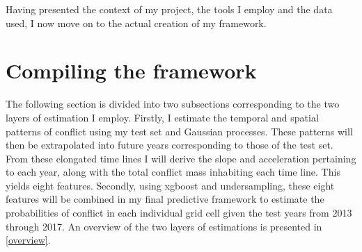 \documentclass[a4paper]{article}
\begin{document}
Having presented the context of my project, the tools I employ and the data used, I now move on to the actual creation of my framework.\par

\section{Compiling the framework}%

The following section is divided into two subsections corresponding to the two layers of estimation I employ. Firstly, I estimate the temporal and spatial patterns of conflict using my test set and Gaussian processes. These patterns will then be extrapolated into future years corresponding to those of the test set. From these elongated time lines I will derive the slope and acceleration pertaining to each year, along with the total conflict mass inhabiting each time line. This yields eight features. Secondly, using xgboost and undersampling, these eight features will be combined in my final predictive framework to estimate the probabilities of conflict in each individual grid cell given the test years from 2013 through 2017. An overview of the two layers of estimations is presented in \autoref{overview}.\par
\end{document}
